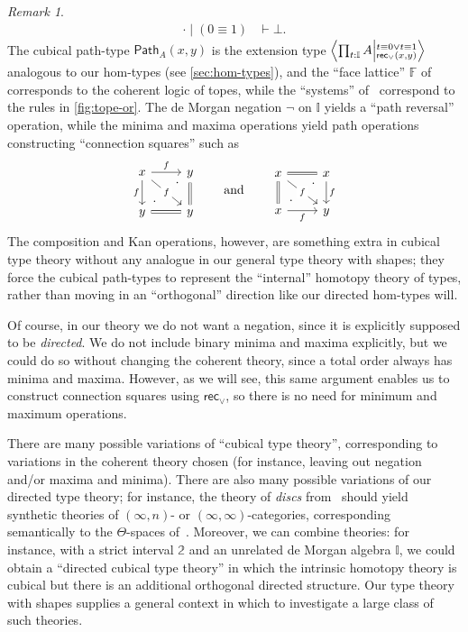 \documentclass[12pt]{amsart}
\theoremstyle{plain}
\theoremstyle{definition}
\theoremstyle{remark}
\newtheorem{rmk}[thm]{Remark}
\numberwithin{equation}{section}
\newcommand{\exten}[4]{\left\langle\mathchoice{\textstyle\prod_{#1}}{\textstyle\prod_{#1}}{\scriptstyle\prod_{#1}}{\scriptscriptstyle\prod_{#1}} #2 \middle|^{#3}_{#4}\right\rangle}
\newcommand{\jdeq}{\equiv}
\newcommand{\types}{\vdash}
\newcommand{\rec}{\mathsf{rec}}
\newcommand{\two}{\mathbb{2}}
\newcommand{\dI}{\mathbb{I}}
\begin{document}
\begin{rmk}
\begin{align*}
    \cdot \mid (0\jdeq 1) &\types \bot.
  \end{align*}
  The cubical path-type $\mathsf{Path}_A(x,y)$ is the extension type $\exten{t:\dI}{A}{t\jdeq 0 \lor t\jdeq 1}{\rec_\lor(x,y)}$ analogous to our hom-types (see \cref{sec:hom-types}), and the ``face lattice'' $\mathbb{F}$ of~\cite{CCHM} corresponds to the coherent logic of topes, while the ``systems'' of~\cite{CCHM} correspond to the rules in \cref{fig:tope-or}.
  The de Morgan negation $\neg$ on $\dI$ yields a ``path reversal'' operation, while the minima and maxima operations yield path operations constructing ``connection squares'' such as
  \[
  \begin{tikzcd}
    x \arrow[r, "f"] \arrow[dr, "f" description] \arrow[d, "f"'] & y \arrow[d, equals] \\
    y \arrow[r, equals]  \arrow[ur, phantom, "\cdot" very near start, "\cdot" very near end] & y
  \end{tikzcd}
  \qquad\text{and}\qquad
  \begin{tikzcd}
    x \arrow[r, equals] \arrow[dr, "f" description] \arrow[d, equals] & x \arrow[d, "f"] \\
    x \arrow[r, "f"']  \arrow[ur, phantom, "\cdot" very near start, "\cdot" very near end] & y
  \end{tikzcd}
  \]
  The composition and Kan operations, however, are something extra in cubical type theory without any analogue in our general type theory with shapes; they force the cubical path-types to represent the ``internal'' homotopy theory of types, rather than moving in an ``orthogonal'' direction like our directed hom-types will.

  Of course, in our theory we do not want a negation, since it is explicitly supposed to be \emph{directed}.
  We do not include binary minima and maxima explicitly, but we could do so without changing the coherent theory, since a total order always has minima and maxima.
  However, as we will see, this same argument enables us to construct connection squares using $\rec_\lor$, so there is no need for minimum and maximum operations.

  There are many possible variations of ``cubical type theory'', corresponding to variations in the coherent theory chosen (for instance, leaving out negation and/or maxima and minima).
  There are also many possible variations of our directed type theory; for instance, the theory of \emph{discs} from~\cite{disks} should yield synthetic theories of $(\infty,n)$- or $(\infty,\infty)$-categories, corresponding semantically to the $\Theta$-spaces of~\cite{rezk-theta}.
  Moreover, we can combine theories: for instance, with a strict interval $\two$ and an unrelated de Morgan algebra $\dI$, we could obtain a ``directed cubical type theory'' in which the intrinsic homotopy theory is cubical but there is an additional orthogonal directed structure.
  Our type theory with shapes supplies a general context in which to investigate a large class of such theories.
\end{rmk}
\end{document}
